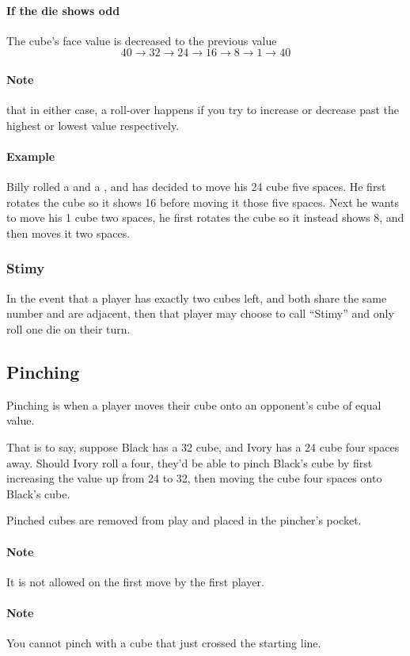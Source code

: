 \documentclass[a4paper]{article}
\begin{document}
\paragraph{If the die shows odd} The cube's face value is decreased to the previous value
$$40 \to 32 \to 24 \to 16 \to 8 \to 1 \to 40$$
\paragraph{Note} that in either case, a roll-over happens if you try to increase or decrease past the highest or lowest value respectively.

\paragraph{Example} Billy rolled a  and a , and has decided to move his 24 cube five spaces. He first rotates the cube so it shows 16 before moving it those five spaces. Next he wants to move his 1 cube two spaces, he first rotates the cube so it instead shows 8, and then moves it two spaces.

\subsubsection{Stimy}
In the event that a player has exactly two cubes left, and both share the same number and are adjacent, then that player may choose to call ``Stimy'' and only roll one die on their turn.

\subsection{Pinching}
Pinching is when a player moves their cube onto an opponent's cube of equal value.

That is to say, suppose Black has a 32 cube, and Ivory has a 24 cube four spaces away. 
Should Ivory roll a four, they'd be able to pinch Black's cube by first increasing the value up from 24 to 32, then moving the cube four spaces onto Black's cube.

Pinched cubes are removed from play and placed in the pincher's pocket.

\paragraph{Note} It is not allowed on the first move by the first player.

\paragraph{Note} You cannot pinch with a cube that just crossed the starting line.
\end{document}
